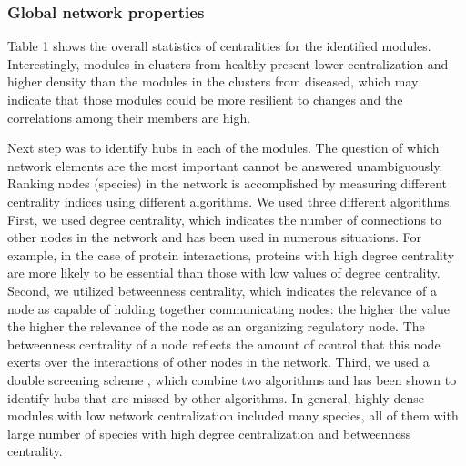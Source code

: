 \subsubsection*{Global network properties}

Table 1 shows the overall statistics of centralities for the identified modules. Interestingly, modules in clusters from healthy  present lower centralization and higher density than the modules in the clusters from diseased, which may indicate that those modules could be more resilient to changes and the correlations among their members are high.

Next step was to identify hubs in each of the modules. The question of which network elements are the most important cannot be answered unambiguously. Ranking nodes (species) in the network is accomplished by measuring different centrality indices using different algorithms. We used three different algorithms. First, we used degree centrality, which indicates the number of connections to other nodes in the network and has been used in numerous situations. For example, in the case of protein interactions, proteins with high degree centrality are more likely to be essential than those with low values of degree centrality. Second, we utilized betweenness centrality, which indicates the relevance of a node as capable of holding together communicating nodes: the higher the value the higher the relevance of the node as an organizing regulatory node. The betweenness centrality of a node reflects the amount of control that this node exerts over the interactions of other nodes in the network. Third, we used a double screening scheme , which combine two algorithms  and has been shown to identify hubs that are missed by other algorithms. In general, highly dense modules with low network centralization included many species, all of them with large number of species with high degree centralization and betweenness centrality.
